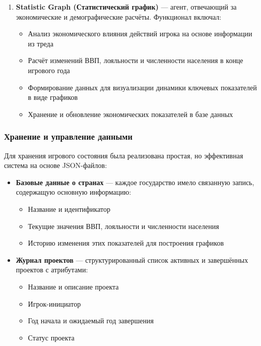 \begin{enumerate}
    \item \textbf{Statistic Graph (Статистический график)} — агент, отвечающий за экономические и демографические расчёты. Функционал включал:
    \begin{itemize}
        \item Анализ экономического влияния действий игрока на основе информации из треда
        \item Расчёт изменений ВВП, лояльности и численности населения в конце игрового года
        \item Формирование данных для визуализации динамики ключевых показателей в виде графиков
        \item Хранение и обновление экономических показателей в базе данных
    \end{itemize}
\end{enumerate}

\subsubsection{Хранение и управление данными}

Для хранения игрового состояния была реализована простая, но эффективная система на основе JSON-файлов:

\begin{itemize}
    \item \textbf{Базовые данные о странах} — каждое государство имело связанную запись, содержащую основную информацию:
    \begin{itemize}
        \item Название и идентификатор
        \item Текущие значения ВВП, лояльности и численности населения
        \item Историю изменения этих показателей для построения графиков
    \end{itemize}

    \item \textbf{Журнал проектов} — структурированный список активных и завершённых проектов с атрибутами:
    \begin{itemize}
        \item Название и описание проекта
        \item Игрок-инициатор
        \item Год начала и ожидаемый год завершения
        \item Статус проекта
    \end{itemize}
\end{itemize}

